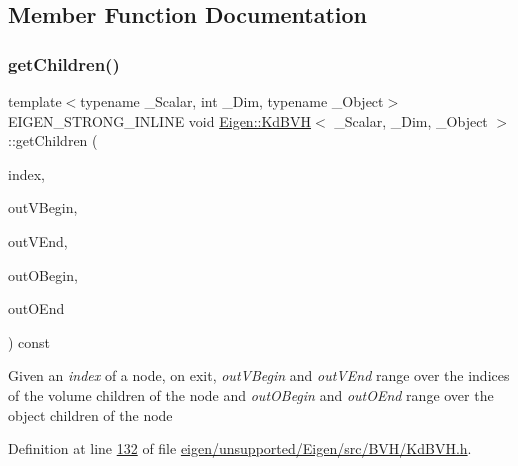 \subsection{Member Function Documentation}
\mbox{\label{class_eigen_1_1_kd_b_v_h_a67326b18fcf16f341d2e4a16006d0205}} 
\subsubsection{\texorpdfstring{get\+Children()}{getChildren()}\hspace{0.1cm}{\footnotesize\ttfamily [1/2]}}
{\footnotesize\ttfamily template$<$typename \+\_\+\+Scalar, int \+\_\+\+Dim, typename \+\_\+\+Object$>$ \\
E\+I\+G\+E\+N\+\_\+\+S\+T\+R\+O\+N\+G\+\_\+\+I\+N\+L\+I\+NE void \hyperlink{class_eigen_1_1_kd_b_v_h}{Eigen\+::\+Kd\+B\+VH}$<$ \+\_\+\+Scalar, \+\_\+\+Dim, \+\_\+\+Object $>$\+::get\+Children (\begin{DoxyParamCaption}\item[{Index}]{index,  }\item[{Volume\+Iterator \&}]{out\+V\+Begin,  }\item[{Volume\+Iterator \&}]{out\+V\+End,  }\item[{Object\+Iterator \&}]{out\+O\+Begin,  }\item[{Object\+Iterator \&}]{out\+O\+End }\end{DoxyParamCaption}) const\hspace{0.3cm}{\ttfamily [inline]}}

Given an {\itshape index} of a node, on exit, {\itshape out\+V\+Begin} and {\itshape out\+V\+End} range over the indices of the volume children of the node and {\itshape out\+O\+Begin} and {\itshape out\+O\+End} range over the object children of the node 

Definition at line \hyperlink{eigen_2unsupported_2_eigen_2src_2_b_v_h_2_kd_b_v_h_8h_source_l00132}{132} of file \hyperlink{eigen_2unsupported_2_eigen_2src_2_b_v_h_2_kd_b_v_h_8h_source}{eigen/unsupported/\+Eigen/src/\+B\+V\+H/\+Kd\+B\+V\+H.\+h}.

\mbox{\label{class_eigen_1_1_kd_b_v_h_a67326b18fcf16f341d2e4a16006d0205}} 
